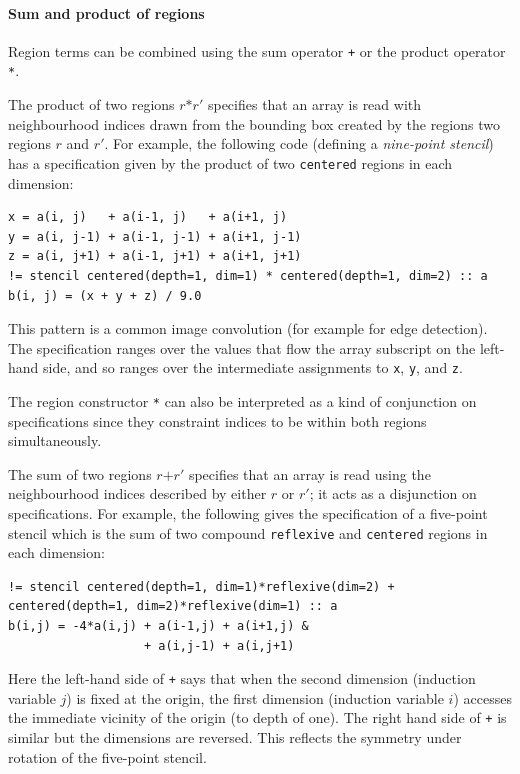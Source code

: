 \documentclass[9pt]{sigplanconf}
\theoremstyle{definition}
\newcommand{\term}[1]{\texttt{#1}}
\begin{document}
\paragraph{Sum and product of regions}
Region terms can be combined using the sum operator
\term{+} or the product operator \term{*}.

The product of two regions $r \texttt{*} r'$ specifies that an array
is read with neighbourhood indices drawn from the bounding box created
by the regions two regions $r$ and $r'$. For example, the following
code (defining a \emph{nine-point stencil}) has a specification given by the
product of two \texttt{centered} regions in each dimension:
\begin{verbatim}
x = a(i, j)   + a(i-1, j)   + a(i+1, j)
y = a(i, j-1) + a(i-1, j-1) + a(i+1, j-1)
z = a(i, j+1) + a(i-1, j+1) + a(i+1, j+1)
!= stencil centered(depth=1, dim=1) * centered(depth=1, dim=2) :: a
b(i, j) = (x + y + z) / 9.0
\end{verbatim}
This pattern is a common image convolution (for example
for edge detection). The specification ranges over the
values that flow the array subscript on the left-hand side,
and so ranges over the intermediate assignments to \term{x},
\term{y}, and \term{z}.

The region constructor \texttt{*} can also be interpreted as a
kind of conjunction on specifications since they constraint
indices to be within both regions simultaneously.

The sum of two regions $r \texttt{+} r'$ specifies that an array is
read using the neighbourhood indices described by either $r$ or
$r'$; it acts as a disjunction on specifications. For
example, the following gives the specification of a five-point
stencil which is the sum of two compound \texttt{reflexive} and
\texttt{centered} regions in each dimension:
\begin{verbatim}
!= stencil centered(depth=1, dim=1)*reflexive(dim=2) + centered(depth=1, dim=2)*reflexive(dim=1) :: a
b(i,j) = -4*a(i,j) + a(i-1,j) + a(i+1,j) &
                   + a(i,j-1) + a(i,j+1)
\end{verbatim}
Here the left-hand side of \texttt{+} says that when the second dimension
(induction variable $j$) is fixed at the origin, the first dimension
(induction variable $i$) accesses the immediate vicinity of the origin
(to depth of one). The right hand side of \texttt{+} is similar but the dimensions are reversed.
This reflects the symmetry under rotation of the five-point stencil.
\end{document}
